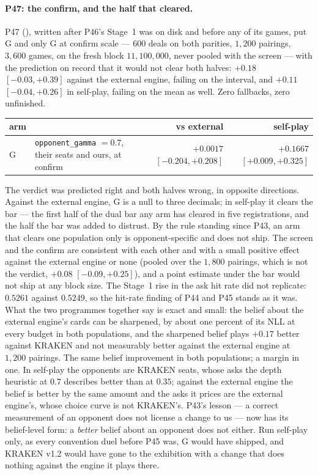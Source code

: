 \documentclass[11pt,letterpaper]{article}
\begin{document}
\paragraph{P47: the confirm, and the half that cleared.} P47
(), written after P46's Stage~1 was on
disk and before any of its games, put G and only G at confirm scale --- $600$
deals on both parities, $1{,}200$ pairings, $3{,}600$ games, on the fresh
block $11{,}100{,}000$, never pooled with the screen --- with the prediction
on record that it would not clear both halves: $+0.18$ $[-0.03, +0.39]$
against the external engine, failing on the interval, and $+0.11$ $[-0.04, +0.26]$ in
self-play, failing on the mean as well. Zero fallbacks, zero unfinished.

\begin{center}
\small
\begin{tabular}{lp{4.6cm}rr}
\toprule
arm & & vs external & self-play \\
\midrule
G & \texttt{opponent\_gamma} $=0.7$, their seats and ours, at confirm & $\mathbf{+0.0017}$ $[-0.204, +0.208]$ & $\mathbf{+0.1667}$ $[+0.009, +0.325]$ \\
\bottomrule
\end{tabular}
\end{center}

\noindent The verdict was predicted right and both halves wrong, in opposite
directions. Against the external engine, G is a null to three decimals; in self-play it
clears the bar --- the first half of the dual bar any arm has cleared in
five registrations, and the half the bar was added to distrust. By the rule
standing since P43, an arm that clears one population only is
opponent-specific and does not ship. The screen and the confirm are
consistent with each other and with a small positive effect against the external engine
or none (pooled over the $1{,}800$ pairings, which is not the verdict,
$+0.08$ $[-0.09, +0.25]$), and a point estimate under the bar would not ship
at any block size. The Stage~1 rise in the ask hit rate did not replicate:
$\mathbf{0.5261}$ against $\mathbf{0.5249}$, so the hit-rate finding of P44
and P45 stands as it was. What the two programmes together say is exact and
small: the belief about the external engine's cards can be sharpened, by about one
percent of its NLL at every budget in both populations, and the sharpened
belief plays $+0.17$ better against KRAKEN and not measurably better against
the external engine at $1{,}200$ pairings. The same belief improvement in both
populations; a margin in one. In self-play the opponents are KRAKEN seats,
whose asks the depth heuristic at $0.7$ describes better than at $0.35$;
against the external engine the belief is better by the same amount and the asks it
prices are the external engine's, whose choice curve is not KRAKEN's. P43's lesson ---
a correct measurement of an opponent does not license a change to us --- now
has its belief-level form: a \emph{better} belief about an opponent does not
either. Run self-play only, as every convention duel before P45 was, G would
have shipped, and KRAKEN v1.2 would have gone to the exhibition with a change
that does nothing against the engine it plays there.
\end{document}
